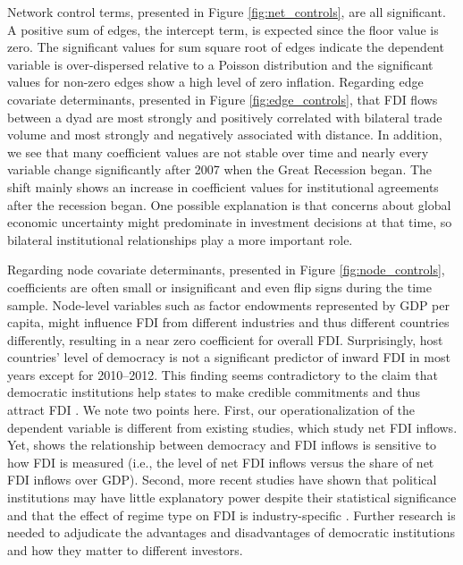 \documentclass[reqno,onecolumn,letterpaper,12pt]{article}
\begin{document}
Network control terms, presented in Figure \ref{fig:net_controls}, are all significant. A positive sum of edges, the intercept term, is expected since the floor value is zero. The significant values for sum square root of edges indicate the dependent variable is over-dispersed relative to a Poisson distribution and the significant values for non-zero edges show a high level of zero inflation. Regarding edge covariate determinants, presented in Figure \ref{fig:edge_controls}, that FDI flows between a dyad are most strongly and positively correlated with bilateral trade volume and most strongly and negatively associated with distance. In addition, we see that many coefficient values are not stable over time and nearly every variable change significantly after 2007 when the Great Recession began. The shift mainly shows an increase in coefficient values for institutional agreements after the recession began. One possible explanation is that concerns about global economic uncertainty might predominate in investment decisions at that time, so bilateral institutional relationships play a more important role.

Regarding node covariate determinants, presented in Figure \ref{fig:node_controls}, coefficients are often small or insignificant and even flip signs during the time sample. Node-level variables such as factor endowments represented by GDP per capita, might influence FDI from different industries and thus different countries differently, resulting in a near zero coefficient for overall FDI. Surprisingly, host countries' level of democracy is not a significant predictor of inward FDI in most years except for 2010--2012. This finding seems contradictory to the claim that democratic institutions help states to make credible commitments and thus attract FDI \cite[e.g.,][]{Jensen:2003,Henisz:2000}. We note two points here. First, our operationalization of the dependent variable is different from existing studies, which study net FDI inflows. Yet, \citet{Li_et_al:2018} shows the relationship between democracy and FDI inflows is sensitive to how FDI is measured (i.e., the level of net FDI inflows versus the share of net FDI inflows over GDP). Second, more recent studies have shown that political institutions may have little explanatory power despite their statistical significance \citep{Arel-Bundock:2017b} and that the effect of regime type on FDI is industry-specific \citep{Wright_Zhu:2018}. Further research is needed to adjudicate the advantages and disadvantages of democratic institutions and how they matter to different investors.
\end{document}
